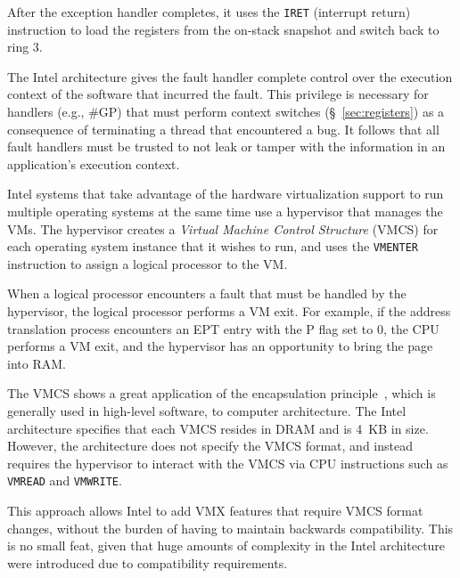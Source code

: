 After the exception handler completes, it uses the \texttt{IRET} (interrupt
return) instruction to load the registers from the on-stack snapshot and switch
back to ring 3.

The Intel architecture gives the fault handler complete control over the
execution context of the software that incurred the fault. This privilege is
necessary for handlers (e.g., \#GP) that must perform context switches
(\S~\ref{sec:registers}) as a consequence of terminating a thread that
encountered a bug. It follows that all fault handlers must be trusted to not
leak or tamper with the information in an application's execution context.


\label{sec:vmx}


Intel systems that take advantage of the hardware virtualization support to run
multiple operating systems at the same time use a hypervisor that manages the
VMs. The hypervisor creates a \textit{Virtual Machine Control Structure} (VMCS)
for each operating system instance that it wishes to run, and uses the
\texttt{VMENTER} instruction to assign a logical processor to the VM.


When a logical processor encounters a fault that must be handled by the
hypervisor, the logical processor performs a VM exit. For example, if the
address translation process encounters an EPT entry with the P flag set to 0,
the CPU performs a VM exit, and the hypervisor has an opportunity to bring the
page into RAM.

The VMCS shows a great application of the encapsulation
principle~\cite{liskov1974adt}, which is generally used in high-level software,
to computer architecture. The Intel architecture specifies that each VMCS
resides in DRAM and is 4~KB in size. However, the architecture does not specify
the VMCS format, and instead requires the hypervisor to interact with the VMCS
via CPU instructions such as \texttt{VMREAD} and \texttt{VMWRITE}.

This approach allows Intel to add VMX features that require VMCS format
changes, without the burden of having to maintain backwards compatibility.
This is no small feat, given that huge amounts of complexity in the Intel
architecture were introduced due to compatibility requirements.
